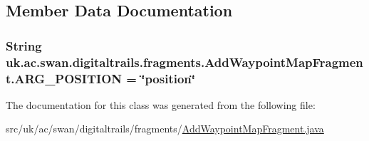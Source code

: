 \subsection{Member Data Documentation}
\hypertarget{classuk_1_1ac_1_1swan_1_1digitaltrails_1_1fragments_1_1_add_waypoint_map_fragment_a1546ba6c384f1a7d77c5146d42368d0a}{
\subsubsection[{A\+R\+G\+\_\+\+P\+O\+S\+I\+T\+I\+O\+N}]{\setlength{\rightskip}{0pt plus 5cm}String uk.\+ac.\+swan.\+digitaltrails.\+fragments.\+Add\+Waypoint\+Map\+Fragment.\+A\+R\+G\+\_\+\+P\+O\+S\+I\+T\+I\+O\+N = \char`\"{}position\char`\"{}\hspace{0.3cm}{\ttfamily [static]}}}\label{classuk_1_1ac_1_1swan_1_1digitaltrails_1_1fragments_1_1_add_waypoint_map_fragment_a1546ba6c384f1a7d77c5146d42368d0a}


The documentation for this class was generated from the following file\+:\begin{DoxyCompactItemize}
\item 
src/uk/ac/swan/digitaltrails/fragments/\hyperlink{_add_waypoint_map_fragment_8java}{Add\+Waypoint\+Map\+Fragment.\+java}\end{DoxyCompactItemize}

